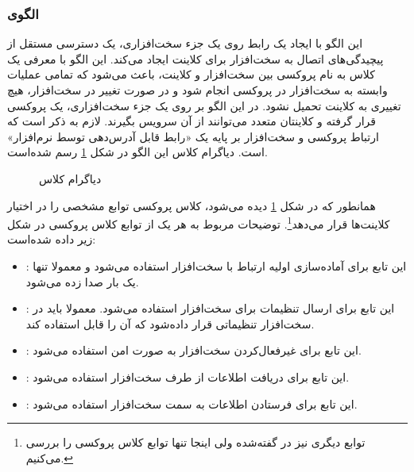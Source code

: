 \subsubsection{الگوی }
\label{HWProxySec}
\begin{RTL}
این الگو با ایجاد یک رابط روی یک جزء سخت‌افزاری، یک دسترسی
مستقل از پیچیدگی‌های اتصال به سخت‌افزار برای کلاینت ایجاد می‌کند.
این الگو با معرفی یک کلاس به نام پروکسی بین سخت‌افزار و کلاینت،
باعث می‌شود که تمامی عملیات وابسته به سخت‌افزار در پروکسی انجام شود
و در صورت تغییر در سخت‌افزار، هیچ تغییری به کلاینت تحمیل نشود.
در این الگو بر روی یک جزء سخت‌افزاری، یک پروکسی قرار گرفته و
کلاینتان متعدد می‌توانند از آن سرویس بگیرند. لازم به ذکر است که ارتباط پروکسی
و سخت‌افزار بر پایه یک «رابط قابل آدرس‌دهی توسط نرم‌افزار» است. 
دیاگرام کلاس این الگو در شکل \ref{HWProxyClassDiag} رسم شده‌است.
\end{RTL}
\begin{figure}[h!]
\centering
{}
\caption{دیاگرام کلاس }
\label{HWProxyClassDiag}
\end{figure}
\begin{RTL}
همانطور که در شکل \ref{HWProxyClassDiag} دیده می‌شود، کلاس پروکسی توابع
مشخصی را در اختیار کلاینت‌ها قرار می‌دهد\footnote{توابع دیگری نیز در \cite{ref1}
گفته‌شده ولی اینجا تنها توابع  کلاس پروکسی را بررسی می‌کنیم.}.
توضیحات مربوط به هر یک از توابع کلاس پروکسی در شکل زیر داده شده‌است:
\begin{itemize}
  \item {}:
  این تابع برای آماده‌سازی اولیه ارتباط با سخت‌افزار استفاده می‌شود و معمولا تنها یک بار
  صدا زده می‌شود.
  \item {}:
  این تابع برای ارسال تنظیمات برای سخت‌افزار استفاده می‌شود. معمولا باید در سخت‌افزار
  تنظیماتی قرار داده‌شود که آن را قابل استفاده کند.
  \item {}:
  این تابع برای غیرفعال‌کردن سخت‌افزار به صورت امن استفاده می‌شود.
  \item {}:
  این تابع برای دریافت اطلاعات از طرف سخت‌افزار استفاده می‌شود.
  \item {}:
  این تابع برای فرستادن اطلاعات به سمت سخت‌افزار استفاده می‌شود.
\end{itemize}
\end{RTL}